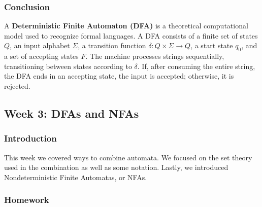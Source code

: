 \documentclass{article}
\theoremstyle{theorem}
\theoremstyle{definition}
\theoremstyle{remark}
\begin{document}
\begin{center}
\end{center}

\newpage

\subsubsection{Conclusion}
A \textbf{Deterministic Finite Automaton (DFA)} is a theoretical computational model used to recognize formal languages. A DFA consists of a finite set of states \( Q \), an input alphabet \( \Sigma \), a transition function \( \delta: Q \times \Sigma \to Q \), a start state \( q_0 \), and a set of accepting states \( F \). The machine processes strings sequentially, transitioning between states according to \( \delta \). If, after consuming the entire string, the DFA ends in an accepting state, the input is accepted; otherwise, it is rejected.

\newpage

\subsection{Week 3: DFAs and NFAs}

\subsubsection{Introduction}
This week we covered ways to combine automata. We focused on the set theory used in the combination as well as some notation.  
Lastly, we introduced Nondeterministic Finite Automatas, or NFAs.

\subsubsection{Homework}
\end{document}
